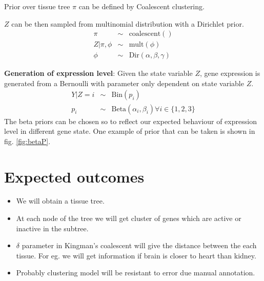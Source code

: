 \documentclass{article}
\begin{document}
Prior over tissue tree $\pi$ can be defined by Coalescent clustering. 

$Z$ can be then sampled from multinomial distribution with a Dirichlet prior.
\begin{eqnarray}
	\pi &\sim& \text{coalescent}()\\
	Z|\pi,\phi &\sim& \text{mult}(\phi) \nonumber \\
	\phi &\sim&  \text{Dir}(\alpha,\beta,\gamma) \nonumber
	\label{eqn:zdist1}
\end{eqnarray}

\par \textbf{Generation of expression level}: 
Given the state variable $Z$, gene expression is generated from a Bernoulli with parameter only dependent on state variable $Z$. 
\begin{eqnarray}
	Y|Z = i &\sim& \text{Bin}(p_i) \nonumber \\
	p_i &\sim&  \text{Beta}(\alpha_i,  \beta_i) \forall i \in \{1,2,3\}  
	\label{eqn:ydist}
\end{eqnarray}
The beta priors can be chosen so to reflect our expected behaviour of expression level in different gene state. One example of prior that can be taken
is shown in fig. \ref{fig:betaP}.


\section{Expected outcomes}
\begin{itemize}
	\item We will obtain a tissue tree. 
	\item At each node of the tree we will get cluster of genes which are active or inactive in the subtree.
	\item $\delta$ parameter in Kingman's coalescent will give the distance between the each tissue. For eg. we will get information if brain is closer to heart
		than kidney. 
	\item Probably clustering model will be resistant to error due manual annotation.
\end{itemize}
\end{document}
